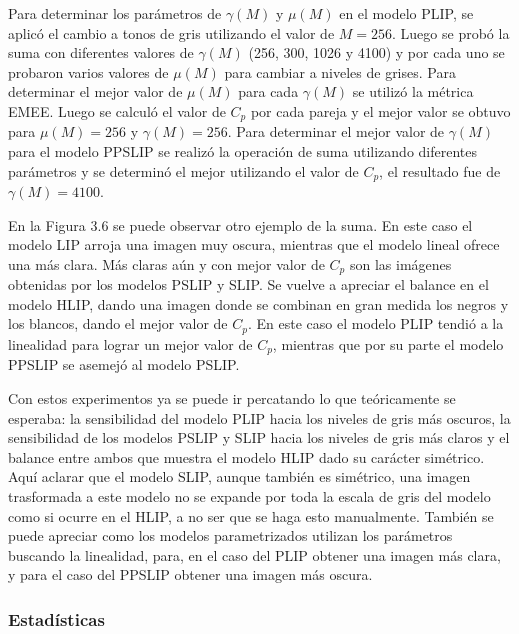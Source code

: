 Para determinar los par\'ametros de $\gamma(M)$ y $\mu(M)$ en el modelo PLIP, se aplic\'o el cambio a tonos de gris utilizando el valor de $M=256$. Luego se prob\'o la suma con diferentes valores de $\gamma(M)$ (256, 300, 1026 y 4100) y por cada uno se probaron varios valores de $\mu(M)$ para cambiar a niveles de grises. Para determinar el mejor valor de $\mu(M)$ para cada $\gamma(M)$ se utiliz\'o la m\'etrica EMEE. Luego se calcul\'o el valor de $C_p$ por cada pareja y el mejor valor se obtuvo para $\mu(M)=256$ y $\gamma(M)=256$. Para determinar el mejor valor de $\gamma(M)$ para el modelo PPSLIP se realiz\'o la operaci\'on de suma utilizando diferentes par\'ametros y se determin\'o el mejor utilizando el valor de $C_p$, el resultado fue de $\gamma(M)=4100$. 

En la Figura 3.6 se puede observar otro ejemplo de la suma. En este caso el modelo LIP arroja una imagen muy oscura, mientras que el modelo lineal ofrece una m\'as clara. M\'as claras a\'un y con mejor valor de $C_p$ son las im\'agenes obtenidas por los modelos PSLIP y SLIP. Se vuelve a apreciar el balance en el modelo HLIP, dando una imagen donde se combinan en gran medida los negros y los blancos, dando el mejor valor de $C_p$. En este caso el modelo PLIP tendi\'o a la linealidad para lograr un mejor valor de $C_p$, mientras que por su parte el modelo PPSLIP se asemej\'o al modelo PSLIP.

Con estos experimentos ya se puede ir percatando lo que te\'oricamente se esperaba: la sensibilidad del modelo PLIP hacia los niveles de gris m\'as oscuros, la sensibilidad de los modelos PSLIP y SLIP hacia los niveles de gris m\'as claros y el balance entre ambos que muestra el modelo HLIP dado su car\'acter sim\'etrico. Aqu\'i aclarar que el modelo SLIP, aunque tambi\'en es sim\'etrico, una imagen trasformada a este modelo no se expande por toda la escala de gris del modelo como si ocurre en el HLIP, a no ser que se haga esto manualmente. Tambi\'en se puede apreciar como los modelos parametrizados utilizan los par\'ametros buscando la linealidad, para, en el caso del PLIP obtener una imagen m\'as clara, y para el caso del PPSLIP obtener una imagen m\'as oscura. 

\subsubsection{Estad\'isticas}

